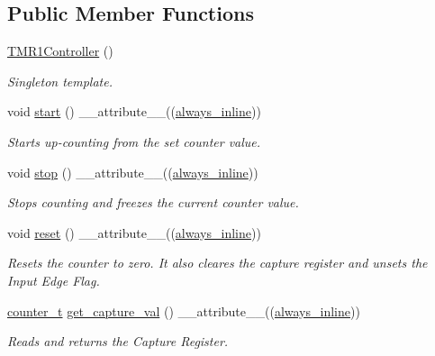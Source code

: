 \subsection*{Public Member Functions}
\begin{DoxyCompactItemize}
\item 
\hyperlink{classTMR1Controller_aebc677e795f673c6520d5a03eb6aa4f2}{T\+M\+R1\+Controller} ()
\begin{DoxyCompactList}\small\item\em Singleton template. \end{DoxyCompactList}\item 
void \hyperlink{classTMR1Controller_a67bc04f0648176a681f6ac01ea483db9}{start} () \+\_\+\+\_\+attribute\+\_\+\+\_\+((\hyperlink{classTMR1Controller_adce8e8a496510485a88ccc5b88595672}{always\+\_\+inline}))
\begin{DoxyCompactList}\small\item\em Starts up-\/counting from the set counter value. \end{DoxyCompactList}\item 
void \hyperlink{classTMR1Controller_afcb0ea27107bfbe50b9dcbd54207dd00}{stop} () \+\_\+\+\_\+attribute\+\_\+\+\_\+((\hyperlink{classTMR1Controller_adce8e8a496510485a88ccc5b88595672}{always\+\_\+inline}))
\begin{DoxyCompactList}\small\item\em Stops counting and freezes the current counter value. \end{DoxyCompactList}\item 
void \hyperlink{classTMR1Controller_adf3746ffd24c5b55abff4fa18e05f6b3}{reset} () \+\_\+\+\_\+attribute\+\_\+\+\_\+((\hyperlink{classTMR1Controller_adce8e8a496510485a88ccc5b88595672}{always\+\_\+inline}))
\begin{DoxyCompactList}\small\item\em Resets the counter to zero. It also cleares the capture register and unsets the Input Edge Flag. \end{DoxyCompactList}\item 
\hyperlink{types_8hpp_a22f279793847eba127de149437848c48}{counter\+\_\+t} \hyperlink{classTMR1Controller_a3d07eed72365e7a7b44fadefb23b9ba6}{get\+\_\+capture\+\_\+val} () \+\_\+\+\_\+attribute\+\_\+\+\_\+((\hyperlink{classTMR1Controller_adce8e8a496510485a88ccc5b88595672}{always\+\_\+inline}))
\begin{DoxyCompactList}\small\item\em Reads and returns the Capture Register. \end{DoxyCompactList}\item 

\end{DoxyCompactItemize}
